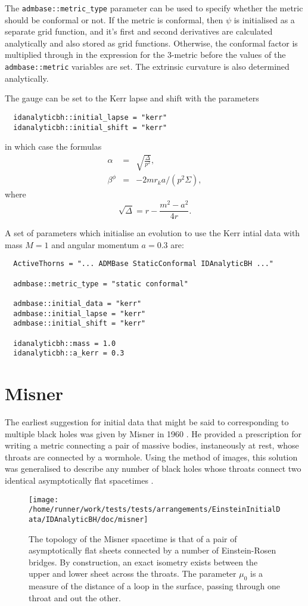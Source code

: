 \documentclass{article}
\begin{document}
The \texttt{admbase::metric\_type} parameter can be used to specify
whether the metric should be conformal or not. If the metric is
conformal, then $\psi$ is initialised as a separate grid function, and
it's first and second derivatives are calculated analytically and also
stored as grid functions. Otherwise, the conformal factor is
multiplied through in the expression for the 3-metric before the
values of the \texttt{admbase::metric} variables are set. The
extrinsic curvature is also determined analytically.

The gauge can be set to the Kerr lapse and shift with the parameters
\begin{verbatim}
  idanalyticbh::initial_lapse = "kerr"
  idanalyticbh::initial_shift = "kerr"
\end{verbatim}
in which case the formulas
\begin{eqnarray}
  \alpha & = &\sqrt{\frac{\Delta}{p^2}}, \\
  \beta^\phi & = & -2 m r_k a / (p^2 \Sigma),
\end{eqnarray}
where
\begin{equation}
  \sqrt{\Delta} = r - \frac{m^2 - a^2}{4r}.
\end{equation}

A set of parameters which initialise an evolution to use the Kerr
intial data with mass $M=1$ and angular momentum $a=0.3$ are:
\begin{verbatim}
  ActiveThorns = "... ADMBase StaticConformal IDAnalyticBH ..."

  admbase::metric_type = "static conformal"

  admbase::initial_data = "kerr"
  admbase::initial_lapse = "kerr"
  admbase::initial_shift = "kerr"

  idanalyticbh::mass = 1.0
  idanalyticbh::a_kerr = 0.3
\end{verbatim}

\section{Misner}

The earliest suggestion for initial data that might be said to
corresponding to multiple black holes was given by Misner in 1960
\cite{CactusEinstein_IDAnalyticBH_misner:1960}. He provided a prescription for writing a metric
connecting a pair of massive bodies, instaneously at rest, whose
throats are connected by a wormhole. Using the method of images, this
solution was generalised to describe any number of black holes whose
throats connect two identical asymptotically flat spacetimes
\cite{CactusEinstein_IDAnalyticBH_misner:1963}.
\begin{figure}
  \centering
  \texttt{[image: /home/runner/work/tests/tests/arrangements/EinsteinInitialData/IDAnalyticBH/doc/misner]}
  \caption{The topology of the Misner spacetime is that of a pair of
  asymptotically flat sheets connected by a number of Einstein-Rosen
  bridges. By construction, an exact isometry exists between the upper
  and lower sheet across the throats. The parameter $\mu_0$ is a
  measure of the distance of a loop in the surface, passing through
  one throat and out the other.}
\end{figure}
\end{document}
